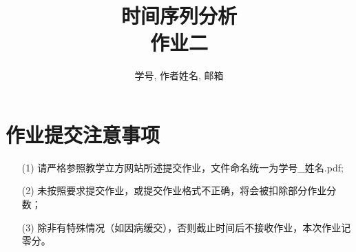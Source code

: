 \documentclass[a4paper,UTF8]{article}
\numberwithin{equation}{section}
\begin{document}
\title{时间序列分析\\
作业二}
\author{学号, 作者姓名, 邮箱}
\maketitle

\section*{作业提交注意事项}
\begin{tcolorbox}
\begin{enumerate}
  \item[(1)] 请严格参照教学立方网站所述提交作业，文件命名统一为{\color{red}学号\_姓名.pdf};
  \item[(2)] 未按照要求提交作业，或提交作业格式不正确，将会被扣除部分作业分数；
  \item[(3)] 除非有特殊情况（如因病缓交），否则截止时间后不接收作业，本次作业记零分。
\end{enumerate}
\end{tcolorbox}
\end{document}

